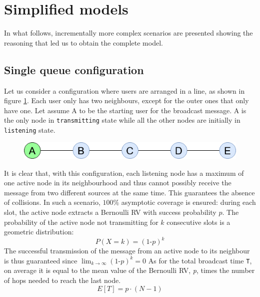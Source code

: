 \section{Simplified models}
In what follows, incrementally more complex scenarios are presented showing the
reasoning that led us to obtain the complete model.
\subsection{Single queue configuration}\label{ssec:singlequeue}
Let us consider a configuration where users are arranged in a line, as shown in
figure \ref{fig:single_queue}. Each user only has two neighbours, except for
the outer ones that only have one. Let assume A to be the starting user for the
broadcast message. A is the only node in \texttt{transmitting} state while all
the other nodes are initially in \texttt{listening} state. 
\begin{figure}[H]%
    \begin{center}
        \includegraphics[scale=0.6]{img/single_queue.png}
        \caption{}%
        \label{fig:single_queue}%
    \end{center}
\end{figure}
\noindent It is clear that, with this configuration, each listening node has a
maximum of one active node in its neighbourhood and thus cannot possibly receive
the message from two different sources at the same time. This guarantees the
absence of collisions. In such a scenario, $100\%$ asymptotic coverage is
ensured: during each slot, the active node extracts a Bernoulli RV with success
probability $p$. The probability of the active node not transmitting for $k$
consecutive slots is a geometric distribution:
\begin{equation}
	P(X = k) = (1\text{-}p)^{k}
	\label{geometric_distribution}
\end{equation}
The successful transmission of the message from an active node to its neighbour is thus guaranteed since $\lim_{k \to \infty} (1\text{-}p)^{k} = 0$
As for the total broadcast time \texttt{T}, on average it is equal to the mean value of the Bernoulli RV, \textit{p}, times the number of hops needed to reach the last node.
\begin{equation}
	E[T] = p \cdot (N-1)
	\label{singleQueueMeanT}
\end{equation}
